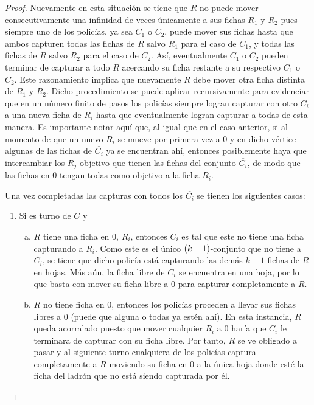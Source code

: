 \begin{proof}
    Nuevamente en esta situaci\'on se tiene que $R$ no puede mover
    consecutivamente una infinidad de veces \'unicamente a sus fichas $R_1$ y
    $R_2$ pues siempre uno de los polic\'ias, ya sea $C_1$ o $C_2$, puede mover
    sus fichas hasta que ambos capturen todas las fichas de $R$ salvo $R_1$ para
    el caso de $C_1$, y todas las fichas de $R$ salvo $R_2$ para el caso de
    $C_2$. As\'i, eventualmente $C_1$ o $C_2$ pueden terminar de capturar a todo
    $R$ acercando su ficha restante a su respectivo $\overline{C_1}$ o
    $\overline{C_2}$. Este razonamiento implica que nuevamente $R$ debe mover
    otra ficha distinta de $R_1$ y $R_2$. Dicho procedimiento se puede aplicar
    recursivamente para evidenciar que en un n\'umero finito de pasos los
    polic\'ias siempre logran capturar con otro $\overline{C_i}$ a una nueva
    ficha de $R_i$ hasta que eventualmente logran capturar a todas de esta
    manera. Es importante notar aqu\'i que, al igual que en el caso anterior, si
    al momento de que un nuevo $R_i$ se mueve por primera vez a $0$ y en dicho
    v\'ertice algunas de las fichas de $\overline{C_i}$ ya se encuentran ah\'i,
    entonces posiblemente haya que intercambiar los $R_j$ objetivo que tienen
    las fichas del conjunto $\overline{C_i}$, de modo que las fichas en $0$
    tengan todas como objetivo a la ficha $R_i$.

    Una vez completadas las capturas con todos los $\overline{C_i}$ se tienen
    los siguientes casos:
    \begin{enumerate}
        \item Si es turno de $C$ y
        \begin{enumerate}[(a)]
            \item $R$ tiene una ficha en $0$, $R_i$, entonces $C_i$ es tal que
            este no tiene una ficha capturando a $R_i$. Como este es el \'unico
            $\left( k-1\right)$-conjunto que no tiene a $C_i$, se tiene que dicho
            polic\'ia est\'a capturando las dem\'as $k-1$ fichas de $R$ en
            hojas. M\'as a\'un, la ficha libre de $C_i$ se encuentra en una
            hoja, por lo que basta con mover su ficha libre a $0$ para capturar
            completamente a $R$.

            \item $R$ no tiene ficha en $0$, entonces los polic\'ias proceden a
            llevar sus fichas libres a $0$ (puede que alguna o todas ya est\'en
            ah\'i). En esta instancia, $R$ queda acorralado puesto que mover
            cualquier $R_i$ a $0$ har\'ia que $C_i$ le terminara de capturar con
            su ficha libre. Por tanto, $R$ se ve obligado a pasar y al siguiente
            turno cualquiera de los polic\'ias captura completamente a $R$
            moviendo su ficha en $0$ a la \'unica hoja donde est\'e la ficha del
            ladr\'on que no est\'a siendo capturada por \'el.
        \end{enumerate}


\end{enumerate}
\end{proof}
